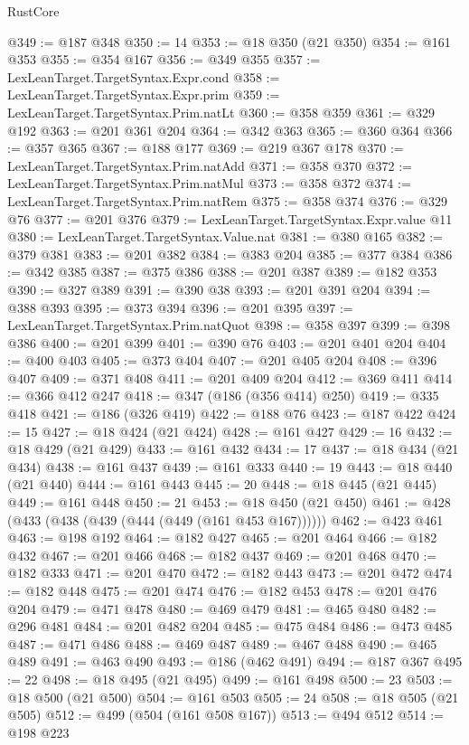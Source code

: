 \begin{lexlean}{RustCore}
\begin{coremodule}
@349 := @187 @348
@350 := 14
@353 := @18 @350 (@21 @350)
@354 := @161 @353
@355 := @354 @167
@356 := @349 @355
@357 := LexLeanTarget.TargetSyntax.Expr.cond
@358 := LexLeanTarget.TargetSyntax.Expr.prim
@359 := LexLeanTarget.TargetSyntax.Prim.natLt
@360 := @358 @359
@361 := @329 @192
@363 := @201 @361 @204
@364 := @342 @363
@365 := @360 @364
@366 := @357 @365
@367 := @188 @177
@369 := @219 @367 @178
@370 := LexLeanTarget.TargetSyntax.Prim.natAdd
@371 := @358 @370
@372 := LexLeanTarget.TargetSyntax.Prim.natMul
@373 := @358 @372
@374 := LexLeanTarget.TargetSyntax.Prim.natRem
@375 := @358 @374
@376 := @329 @76
@377 := @201 @376
@379 := LexLeanTarget.TargetSyntax.Expr.value @11
@380 := LexLeanTarget.TargetSyntax.Value.nat
@381 := @380 @165
@382 := @379 @381
@383 := @201 @382
@384 := @383 @204
@385 := @377 @384
@386 := @342 @385
@387 := @375 @386
@388 := @201 @387
@389 := @182 @353
@390 := @327 @389
@391 := @390 @38
@393 := @201 @391 @204
@394 := @388 @393
@395 := @373 @394
@396 := @201 @395
@397 := LexLeanTarget.TargetSyntax.Prim.natQuot
@398 := @358 @397
@399 := @398 @386
@400 := @201 @399
@401 := @390 @76
@403 := @201 @401 @204
@404 := @400 @403
@405 := @373 @404
@407 := @201 @405 @204
@408 := @396 @407
@409 := @371 @408
@411 := @201 @409 @204
@412 := @369 @411
@414 := @366 @412 @247
@418 := @347 (@186 (@356 @414) @250)
@419 := @335 @418
@421 := @186 (@326 @419)
@422 := @188 @76
@423 := @187 @422
@424 := 15
@427 := @18 @424 (@21 @424)
@428 := @161 @427
@429 := 16
@432 := @18 @429 (@21 @429)
@433 := @161 @432
@434 := 17
@437 := @18 @434 (@21 @434)
@438 := @161 @437
@439 := @161 @333
@440 := 19
@443 := @18 @440 (@21 @440)
@444 := @161 @443
@445 := 20
@448 := @18 @445 (@21 @445)
@449 := @161 @448
@450 := 21
@453 := @18 @450 (@21 @450)
@461 := @428 (@433 (@438 (@439 (@444 (@449 (@161 @453 @167))))))
@462 := @423 @461
@463 := @198 @192
@464 := @182 @427
@465 := @201 @464
@466 := @182 @432
@467 := @201 @466
@468 := @182 @437
@469 := @201 @468
@470 := @182 @333
@471 := @201 @470
@472 := @182 @443
@473 := @201 @472
@474 := @182 @448
@475 := @201 @474
@476 := @182 @453
@478 := @201 @476 @204
@479 := @471 @478
@480 := @469 @479
@481 := @465 @480
@482 := @296 @481
@484 := @201 @482 @204
@485 := @475 @484
@486 := @473 @485
@487 := @471 @486
@488 := @469 @487
@489 := @467 @488
@490 := @465 @489
@491 := @463 @490
@493 := @186 (@462 @491)
@494 := @187 @367
@495 := 22
@498 := @18 @495 (@21 @495)
@499 := @161 @498
@500 := 23
@503 := @18 @500 (@21 @500)
@504 := @161 @503
@505 := 24
@508 := @18 @505 (@21 @505)
@512 := @499 (@504 (@161 @508 @167))
@513 := @494 @512
@514 := @198 @223

\end{coremodule}
\end{lexlean}
